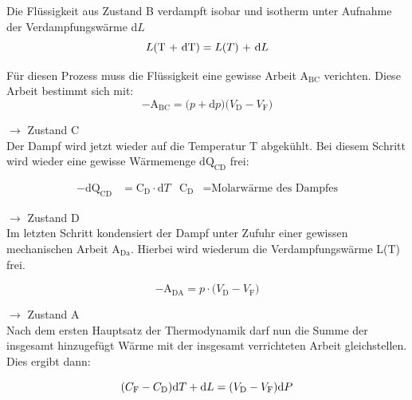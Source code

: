 \noindent Die Flüssigkeit aus Zustand B verdampft isobar und isotherm unter Aufnahme der Verdampfungswärme d$L$\\

\begin{equation}
L\text{(T + dT)} = L\text{(}T\text{) + d}L\nonumber\\
\end{equation}

\noindent Für diesen Prozess muss die Flüssigkeit eine gewisse Arbeit $\text{A}_\text{BC}$ verichten. Diese Arbeit bestimmt sich mit:\\

\begin{equation}
   - \text{A}_\text{BC} = \text{(}p + \text{d}p\text{)(}V_\text{D} - V_\text{F}\text{)} \nonumber
\end{equation}

$\rightarrow$ Zustand C\\
Der Dampf wird jetzt wieder auf die Temperatur T abgekühlt.
Bei diesem Schritt wird wieder eine gewisse Wärmemenge $\text{dQ}_\text{CD}$ frei:

\begin{align}
 -\text{dQ}_\text{CD} &=\text{C}_\text{D}\cdot \text{d}T & \text{C}_\text{D}&=\text{Molarwärme des Dampfes}  \nonumber 
\end{align}

$\rightarrow$ Zustand D\\
Im letzten Schritt kondensiert der Dampf unter Zufuhr einer gewissen mechanischen Arbeit $\text{A}_\text{Da}$.
Hierbei wird wiederum die Verdampfungswärme L(T) frei.

\begin{equation}
    -\text{A}_\text{DA}= p\cdot\text{(}V_\text{D} - V_\text{F}\text{)}  \nonumber
\end{equation}

$\rightarrow$ Zustand A\\


\noindent Nach dem ersten Hauptsatz der Thermodynamik darf nun die Summe der insgesamt hinzugefügt Wärme mit der insgesamt 
verrichteten Arbeit gleichstellen. Dies ergibt dann:    

\begin{equation}
    (C_\text{F}-C_\text{D}\text{)d}T + \text{d}L = \text{(}V_\text{D}-V_\text{F}\text{)d}P\\
    \label{eqn:wearme=Arbeit}
\end{equation}


